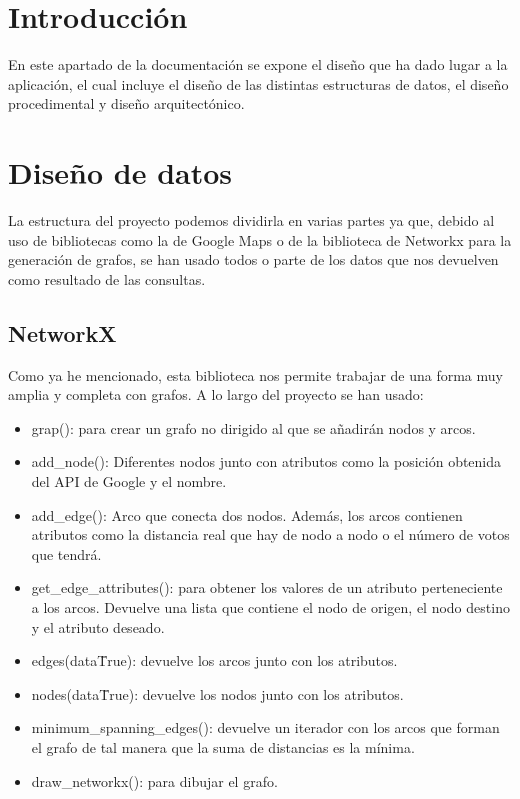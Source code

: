 
\section{Introducción}
En este apartado de la documentación se expone el diseño que ha dado lugar a la aplicación, el cual incluye el diseño de las distintas estructuras de datos, el diseño procedimental y diseño arquitectónico.

\section{Diseño de datos}
La estructura del proyecto podemos dividirla en varias partes ya que, debido al uso de bibliotecas como la de Google Maps o de la biblioteca de Networkx para la generación de grafos, se han usado todos o parte de los datos que nos devuelven como resultado de las consultas.

\subsection{NetworkX}
Como ya he mencionado, esta biblioteca nos permite trabajar de una forma muy amplia y completa con grafos. A lo largo del proyecto se han usado:
\begin{itemize}
	\item grap(): para crear un grafo no dirigido al que se añadirán nodos y arcos.
	\item add\_node(): Diferentes nodos junto con atributos como la posición obtenida del API de Google y el nombre.
	\item add\_edge(): Arco que conecta dos nodos. Además, los arcos contienen atributos como la distancia real que hay de nodo a nodo o el número de votos que tendrá.
	\item get\_edge\_attributes(): para obtener los valores de un atributo perteneciente a los arcos. Devuelve una lista que contiene el nodo de origen, el nodo destino y el atributo deseado.
	\item edges(data\=True): devuelve los arcos junto con los atributos.
	\item nodes(data\=True): devuelve los nodos junto con los atributos.
	\item minimum\_spanning\_edges(): devuelve un iterador con los arcos que forman el grafo de tal manera que la suma de distancias es la mínima.
	\item draw\_networkx(): para dibujar el grafo.
\end{itemize}


